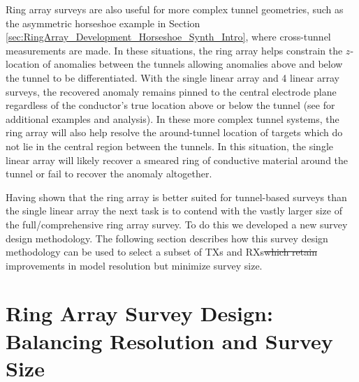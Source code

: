 \documentclass[preprint,authoryear,12pt]{elsarticle}
\providecommand{\DIFaddtex}[1]{{\protect\color{blue}\uwave{#1}}} %
\providecommand{\DIFdeltex}[1]{{\protect\color{red}\sout{#1}}}                      %
\providecommand{\DIFaddbegin}{} %
\providecommand{\DIFaddend}{} %
\providecommand{\DIFdelbegin}{} %
\providecommand{\DIFdelend}{} %
\providecommand{\DIFadd}[1]{\texorpdfstring{\DIFaddtex{#1}}{#1}} %
\providecommand{\DIFdel}[1]{\texorpdfstring{\DIFdeltex{#1}}{}} %
\begin{document}
Ring array surveys are also useful for more complex tunnel geometries, such as the asymmetric horseshoe example in Section \ref{sec:RingArray_Development_Horseshoe_Synth_Intro}, where cross-tunnel measurements are made. In these situations, the ring array helps constrain the $z$-location of anomalies between the tunnels allowing anomalies above and below the tunnel to be differentiated. With the single linear array and 4 linear array surveys, the recovered anomaly remains pinned to the central electrode plane regardless of the conductor's true location above or below the tunnel (see \citet{Mitchell2020} for additional examples and analysis). In these more complex tunnel systems, the ring array will also help resolve the around-tunnel location of targets which do not lie in the central region between the tunnels. In this situation, the single linear array will likely recover a smeared ring of conductive material around the tunnel or fail to recover the anomaly altogether.

Having shown that the ring array is better suited for tunnel-based surveys than the single linear array the next task is to contend with the vastly larger size of the full/comprehensive ring array survey. To do this we developed a new survey design methodology. The following section describes how this survey design methodology can be used to select a subset of TXs and RXs\DIFdelbegin \DIFdel{which retain }\DIFdelend \DIFaddbegin \DIFadd{, which retains }\DIFaddend improvements in model resolution but minimize survey size.

\section{Ring Array Survey Design: Balancing Resolution and Survey Size}
\label{sec:RingArray_SurveyDesign}
\end{document}
